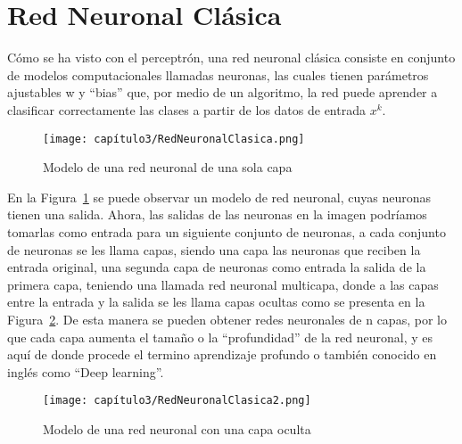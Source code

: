 \section{Red Neuronal Clásica}
Cómo se ha visto con el perceptrón, una red neuronal clásica consiste en conjunto de modelos computacionales llamadas neuronas, las cuales tienen parámetros ajustables w y “bias” que, por medio de un algoritmo, la red puede aprender a clasificar correctamente las clases a partir de los datos de entrada $x^k$.
\begin{figure}[htbp]
\begin{center}
\texttt{[image: capítulo3/RedNeuronalClasica.png]}
\caption{Modelo de una red neuronal de una sola capa}
\label{fig:rnc}
\end{center}
\end{figure}
En la Figura~\ref{fig:rnc} se puede observar un modelo de red neuronal, cuyas neuronas tienen una salida. Ahora, las salidas de las neuronas en la imagen podríamos tomarlas como entrada para un siguiente conjunto de neuronas, a cada conjunto de neuronas se les llama capas, siendo una capa las neuronas que reciben la entrada original, una segunda capa de neuronas como entrada la salida de la primera capa, teniendo una llamada red neuronal multicapa, donde a las capas entre la entrada y la salida se les llama capas ocultas como se presenta en la Figura~\ref{fig:rnc2}. 
De esta manera se pueden obtener redes neuronales de n capas, por lo que cada capa aumenta el tamaño o la “profundidad” de la red neuronal, y es aquí de donde procede el termino aprendizaje profundo o también conocido en inglés como “Deep learning”.
\begin{figure}[htbp]
\begin{center}
\texttt{[image: capítulo3/RedNeuronalClasica2.png]}
\caption{Modelo de una red neuronal con una capa oculta}
\label{fig:rnc2}
\end{center}
\end{figure}
